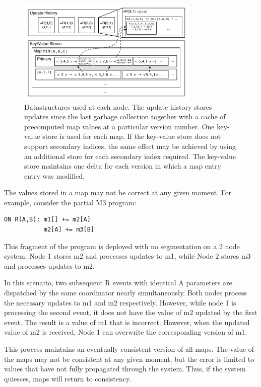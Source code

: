 \documentclass{vldb}
\begin{document}
\begin{figure}
\begin{center}
\includegraphics[width=3.4in]{graphics/Datastructures}
\caption{Datastructures used at each node.  The update history stores updates since the last garbage collection together with a cache of precomputed map values at a particular version number.  One key-value store is used for each map.  If the key-value store does not support secondary indices, the same effect may be achieved by using an additional store for each secondary index required.  The key-value store maintains one delta for each version in which a map entry entry was modified.}
\label{fig:datastructures}
\end{center}
\end{figure}

The values stored in a map may not be correct at any given moment.  For example, consider the partial M3 program:
\begin{verbatim}
ON R(A,B): m1[] += m2[A]
           m2[A] += m3[B]
\end{verbatim}
This fragment of the program is deployed with no segmentation on a 2 node system.  Node 1 stores m2 and processes updates to m1, while Node 2 stores m3 and processes updates to m2.  

In this scenario, two subsequent R events with identical A parameters are dispatched by the same coordinator nearly simultaneously.  Both nodes process the necessary updates to m1 and m2 respectively.  However, while node 1 is processing the second event, it does not have the value of m2 updated by the first event.  The result is a value of m1 that is incorrect.  However, when the updated value of m2 is received, Node 1 can overwrite the corresponding version of m1.  

This process maintains an eventually consistent version of all maps.  The value of the maps may not be consistent at any given moment, but the error is limited to values that have not fully propagated through the system.  Thus, if the system quiesces, maps will return to consistency.
\end{document}
